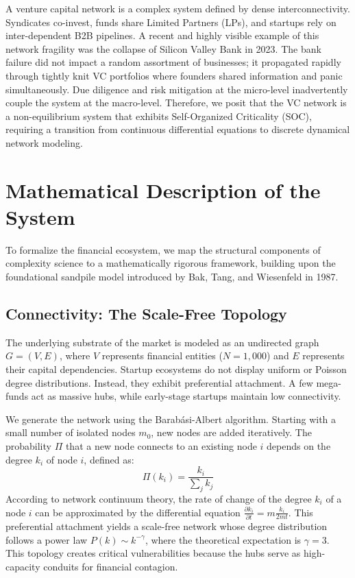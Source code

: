 \documentclass[12pt, a4paper, titlepage]{article}
\begin{document}
A venture capital network is a complex system defined by dense interconnectivity. Syndicates co-invest, funds share Limited Partners (LPs), and startups rely on inter-dependent B2B pipelines. A recent and highly visible example of this network fragility was the collapse of Silicon Valley Bank in 2023. The bank failure did not impact a random assortment of businesses; it propagated rapidly through tightly knit VC portfolios where founders shared information and panic simultaneously. Due diligence and risk mitigation at the micro-level inadvertently couple the system at the macro-level. Therefore, we posit that the VC network is a non-equilibrium system that exhibits Self-Organized Criticality (SOC), requiring a transition from continuous differential equations to discrete dynamical network modeling.

\section{Mathematical Description of the System}
To formalize the financial ecosystem, we map the structural components of complexity science to a mathematically rigorous framework, building upon the foundational sandpile model introduced by Bak, Tang, and Wiesenfeld in 1987.

\subsection{Connectivity: The Scale-Free Topology}
The underlying substrate of the market is modeled as an undirected graph $G = (V, E)$, where $V$ represents financial entities ($N = 1,000$) and $E$ represents their capital dependencies. Startup ecosystems do not display uniform or Poisson degree distributions. Instead, they exhibit preferential attachment. A few mega-funds act as massive hubs, while early-stage startups maintain low connectivity. 

We generate the network using the Barab\'asi-Albert algorithm. Starting with a small number of isolated nodes $m_0$, new nodes are added iteratively. The probability $\Pi$ that a new node connects to an existing node $i$ depends on the degree $k_i$ of node $i$, defined as:
\begin{equation}
    \Pi(k_i) = \frac{k_i}{\sum_{j} k_j}
\end{equation}
According to network continuum theory, the rate of change of the degree $k_i$ of a node $i$ can be approximated by the differential equation $\frac{\partial k_i}{\partial t} = m \frac{k_i}{2mt}$. This preferential attachment yields a scale-free network whose degree distribution follows a power law $P(k) \sim k^{-\gamma}$, where the theoretical expectation is $\gamma = 3$. This topology creates critical vulnerabilities because the hubs serve as high-capacity conduits for financial contagion.
\end{document}
